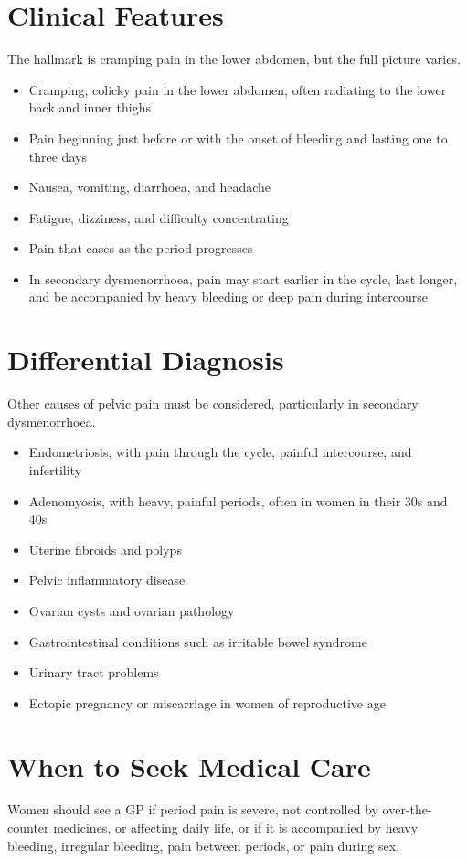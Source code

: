 \section*{Clinical Features}
The hallmark is cramping pain in the lower abdomen, but the full picture varies.
\begin{itemize}
    \item Cramping, colicky pain in the lower abdomen, often radiating to the lower back and inner thighs
    \item Pain beginning just before or with the onset of bleeding and lasting one to three days
    \item Nausea, vomiting, diarrhoea, and headache
    \item Fatigue, dizziness, and difficulty concentrating
    \item Pain that eases as the period progresses
    \item In secondary dysmenorrhoea, pain may start earlier in the cycle, last longer, and be accompanied by heavy bleeding or deep pain during intercourse
\end{itemize}

\section*{Differential Diagnosis}
Other causes of pelvic pain must be considered, particularly in secondary dysmenorrhoea.
\begin{itemize}
    \item Endometriosis, with pain through the cycle, painful intercourse, and infertility
    \item Adenomyosis, with heavy, painful periods, often in women in their 30s and 40s
    \item Uterine fibroids and polyps
    \item Pelvic inflammatory disease
    \item Ovarian cysts and ovarian pathology
    \item Gastrointestinal conditions such as irritable bowel syndrome
    \item Urinary tract problems
    \item Ectopic pregnancy or miscarriage in women of reproductive age
\end{itemize}

\section*{When to Seek Medical Care}
Women should see a GP if period pain is severe, not controlled by over-the-counter medicines, or affecting daily life, or if it is accompanied by heavy bleeding, irregular bleeding, pain between periods, or pain during sex.


